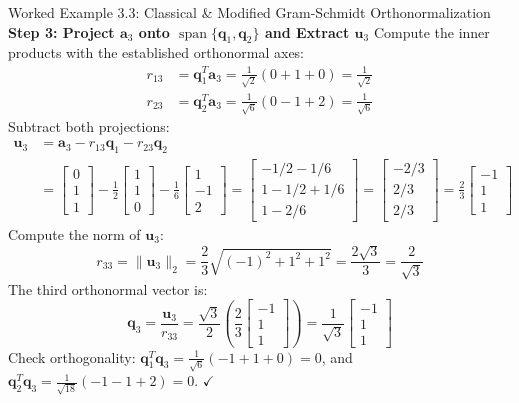\begin{examplebox}{Worked Example 3.3: Classical \& Modified Gram-Schmidt Orthonormalization}
\textbf{Step 3: Project $\mathbf{a}_3$ onto $\operatorname{span}\{\mathbf{q}_1, \mathbf{q}_2\}$ and Extract $\mathbf{u}_3$}
Compute the inner products with the established orthonormal axes:
\begin{align*}
r_{13} &= \mathbf{q}_1^T \mathbf{a}_3 = \frac{1}{\sqrt{2}}(0 + 1 + 0) = \frac{1}{\sqrt{2}} \\
r_{23} &= \mathbf{q}_2^T \mathbf{a}_3 = \frac{1}{\sqrt{6}}(0 - 1 + 2) = \frac{1}{\sqrt{6}}
\end{align*}
Subtract both projections:
\begin{align*}
\mathbf{u}_3 &= \mathbf{a}_3 - r_{13}\mathbf{q}_1 - r_{23}\mathbf{q}_2 \\
&= \begin{bmatrix} 0 \\ 1 \\ 1 \end{bmatrix} - \frac{1}{2}\begin{bmatrix} 1 \\ 1 \\ 0 \end{bmatrix} - \frac{1}{6}\begin{bmatrix} 1 \\ -1 \\ 2 \end{bmatrix} = \begin{bmatrix} -1/2 - 1/6 \\ 1 - 1/2 + 1/6 \\ 1 - 2/6 \end{bmatrix} = \begin{bmatrix} -2/3 \\ 2/3 \\ 2/3 \end{bmatrix} = \frac{2}{3} \begin{bmatrix} -1 \\ 1 \\ 1 \end{bmatrix}
\end{align*}
Compute the norm of $\mathbf{u}_3$:
\begin{equation*}
r_{33} = \|\mathbf{u}_3\|_2 = \frac{2}{3} \sqrt{(-1)^2 + 1^2 + 1^2} = \frac{2\sqrt{3}}{3} = \frac{2}{\sqrt{3}}
\end{equation*}
The third orthonormal vector is:
\begin{equation*}
\mathbf{q}_3 = \frac{\mathbf{u}_3}{r_{33}} = \frac{\sqrt{3}}{2} \left( \frac{2}{3}\begin{bmatrix} -1 \\ 1 \\ 1 \end{bmatrix} \right) = \frac{1}{\sqrt{3}} \begin{bmatrix} -1 \\ 1 \\ 1 \end{bmatrix}
\end{equation*}
Check orthogonality:
$\mathbf{q}_1^T \mathbf{q}_3 = \frac{1}{\sqrt{6}}(-1 + 1 + 0) = 0$, and $\mathbf{q}_2^T \mathbf{q}_3 = \frac{1}{\sqrt{18}}(-1 - 1 + 2) = 0$. $\checkmark$


\end{examplebox}
